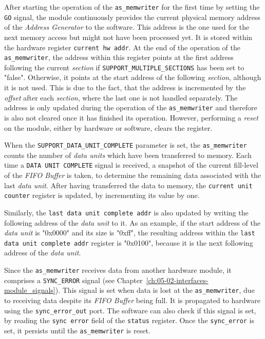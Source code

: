 After starting the operation of the \texttt{as\_memwriter} for the first time by setting the \texttt{GO} signal, the module continuously provides the current physical memory address of the \textit{Address Generator} to the software.
This address is the one used for the next memory access but might not have been processed yet.
It is stored within the hardware register \texttt{current hw addr}.
At the end of the operation of the \texttt{as\_memwriter}, the address within this register points at the first address following the current \textit{section} if \texttt{SUPPORT\_MULTIPLE\_SECTIONS} has been set to "false".
Otherwise, it points at the start address of the following \textit{section}, although it is not used.
This is due to the fact, that the address is incremented by the \textit{offset} after each \textit{section}, where the last one is not handled separately.
The address is only updated during the operation of the \texttt{as\_memwriter} and therefore is also not cleared once it has finished its operation.
However, performing a \textit{reset} on the module, either by hardware or software, clears the register.


When the \texttt{SUPPORT\_DATA\_UNIT\_COMPLETE} parameter is set, the \texttt{as\_memwriter} counts the number of \textit{data units} which have been transferred to memory.
Each time a \texttt{DATA UNIT COMPLETE} signal is received, a snapshot of the current fill-level of the \textit{FIFO Buffer} is taken, to determine the remaining data associated with the last \textit{data unit}.
After having transferred the data to memory, the \texttt{current unit counter} register is updated, by incrementing its value by one.


Similarly, the \texttt{last data unit complete addr} is also updated by writing the following address of the \textit{data unit} to it.
As an example, if the start address of the \textit{data unit} is "0x0000" and its size is "0xff", the resulting address within the \texttt{last data unit complete addr} register is "0x0100", because it is the next following address of the \textit{data unit}.


Since the \texttt{as\_memwriter} receives data from another hardware module, it comprises a \texttt{SYNC\_ERROR} signal (see Chapter~\ref{ch:05-02-interfaces-module_signals}).
This signal is set when data is lost at the \texttt{as\_memwriter}, due to receiving data despite its \textit{FIFO Buffer} being full.
It is propagated to hardware using the \texttt{sync\_error\_out} port.
The software can also check if this signal is set, by reading the \texttt{sync error} field of the \texttt{status} register.
Once the \texttt{sync\_error} is set, it persists until the \texttt{as\_memwriter} is reset.


